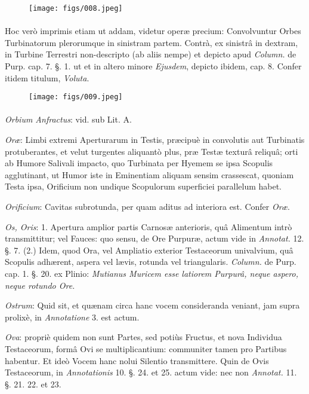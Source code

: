 \documentclass[a4paper, 11pt, oneside, polutonikogreek, german]{article}
\begin{document}
\begin{figure}[H]
\centering
\texttt{[image: figs/008.jpeg]}
\end{figure}
\paragraph{}
Hoc verò imprimis etiam ut addam, videtur operæ precium: Convolvuntur Orbes Turbinatorum plerorumque in sinistram partem. Contrà, ex sinistrâ in dextram, in Turbine Terrestri non-descripto (ab aliis nempe) et depicto apud \emph{Column.} de Purp. cap. 7. §. 1. ut et in altero minore \emph{Ejusdem}, depicto ibidem, cap. 8. Confer itidem titulum, \emph{Voluta}.

\begin{figure}[H]
\centering
\texttt{[image: figs/009.jpeg]}
\end{figure}
\paragraph{}
\emph{Orbium Anfractus}: vid. sub Lit. A.

\emph{Oræ}: Limbi extremi Aperturarum in Testis, præcipuè in convolutis aut Turbinatis protuberantes, et velut turgentes aliquantò plus, præ Testæ texturâ reliquâ; orti ab Humore Salivali impacto, quo Turbinata per Hyemem se ipsa Scopulis agglutinant, ut Humor iste in Eminentiam aliquam sensim crassescat, quoniam Testa ipsa, Orificium non undique Scopulorum superficiei parallelum habet.

\emph{Orificium}: Cavitas subrotunda, per quam aditus ad interiora est. Confer \emph{Oræ}.

\emph{Os, Oris}: 1. Apertura amplior partis Carnosæ anterioris, quâ Alimentum intrò transmittitur; vel Fauces: quo sensu, de Ore Purpuræ, actum vide in \emph{Annotat.} 12. §. 7. (2.) Idem, quod Ora, vel Ampliatio exterior Testaceorum univalvium, quâ Scopulis adhærent, aspera vel lævis, rotunda vel triangularis. \emph{Column.} de Purp. cap. 1. §. 20. ex Plinio: \emph{Mutianus Muricem esse latiorem Purpurâ, neque aspero, neque rotundo Ore.}

\emph{Ostrum}: Quid sit, et quænam circa hanc vocem consideranda veniant, jam supra prolixè, in \emph{Annotatione} 3. est actum.

\emph{Ova}: propriè quidem non sunt Partes, sed potiùs Fructus, et nova Individua Testaceorum, formâ Ovi se multiplicantium: communiter tamen pro Partibus habentur. Et ideò Vocem hanc nolui Silentio transmittere. Quin de Ovis Testaceorum, in \emph{Annotationis} 10. §. 24. et 25. actum vide: nec non \emph{Annotat.} 11. §. 21. 22. et 23.
\end{document}
